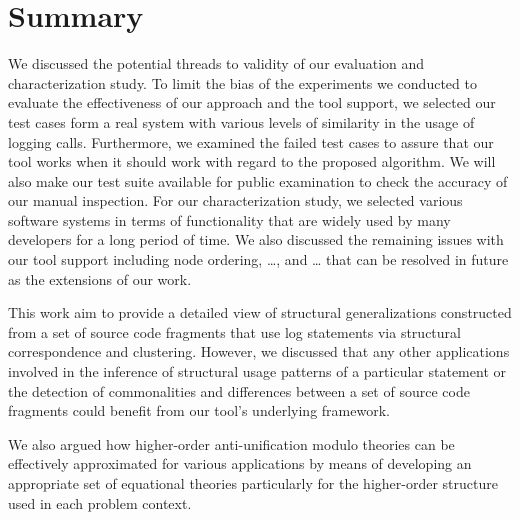 \section{Summary}  \label{diss-summary}
We discussed the potential threads to validity of our evaluation and characterization study. To limit the bias of the experiments we conducted to evaluate the effectiveness of our approach and the tool support, we selected our test cases form a real system with various levels of similarity in the usage of logging calls. Furthermore, we examined the failed test cases to assure that our tool works when it should work with regard to the proposed algorithm. We will also make our test suite available for public examination to check the accuracy of our manual inspection. For our characterization study, we selected various software systems in terms of functionality that are widely used by many developers for a long period of time. We also discussed the remaining issues with our tool support including node ordering, …, and … that can be resolved in future as the extensions of our work.

This work aim to provide a detailed view of structural generalizations constructed from a set of source code fragments that use log statements via structural correspondence and clustering. However, we discussed that any other applications involved in the inference of structural usage patterns of a particular statement or the detection of commonalities and differences between a set of source code fragments could benefit from our tool’s underlying framework.

We also argued how higher-order anti-unification modulo theories can be effectively approximated for various applications by means of developing an appropriate set of equational theories particularly for the higher-order structure used in each problem context. 
